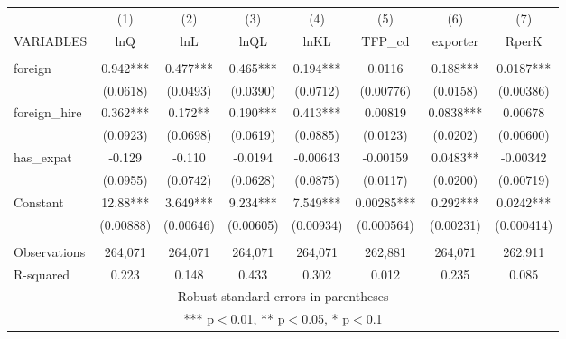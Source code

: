 \begin{tabular}{lccccccc} \hline
 & (1) & (2) & (3) & (4) & (5) & (6) & (7) \\
VARIABLES & lnQ & lnL & lnQL & lnKL & TFP\_cd & exporter & RperK \\ \hline
 &  &  &  &  &  &  &  \\
foreign & 0.942*** & 0.477*** & 0.465*** & 0.194*** & 0.0116 & 0.188*** & 0.0187*** \\
 & (0.0618) & (0.0493) & (0.0390) & (0.0712) & (0.00776) & (0.0158) & (0.00386) \\
foreign\_hire & 0.362*** & 0.172** & 0.190*** & 0.413*** & 0.00819 & 0.0838*** & 0.00678 \\
 & (0.0923) & (0.0698) & (0.0619) & (0.0885) & (0.0123) & (0.0202) & (0.00600) \\
has\_expat & -0.129 & -0.110 & -0.0194 & -0.00643 & -0.00159 & 0.0483** & -0.00342 \\
 & (0.0955) & (0.0742) & (0.0628) & (0.0875) & (0.0117) & (0.0200) & (0.00719) \\
Constant & 12.88*** & 3.649*** & 9.234*** & 7.549*** & 0.00285*** & 0.292*** & 0.0242*** \\
 & (0.00888) & (0.00646) & (0.00605) & (0.00934) & (0.000564) & (0.00231) & (0.000414) \\
 &  &  &  &  &  &  &  \\
Observations & 264,071 & 264,071 & 264,071 & 264,071 & 262,881 & 264,071 & 262,911 \\
 R-squared & 0.223 & 0.148 & 0.433 & 0.302 & 0.012 & 0.235 & 0.085 \\ \hline
\multicolumn{8}{c}{ Robust standard errors in parentheses} \\
\multicolumn{8}{c}{ *** p$<$0.01, ** p$<$0.05, * p$<$0.1} \\
\end{tabular}
